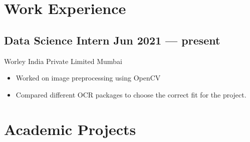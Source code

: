 \documentclass[10pt]{article}
\newcommand{\subtext}[1]{
#1\par\vspace{-0.2cm}}
\newenvironment{zitemize}{
\begin{itemize}\itemsep2pt \parskip0pt \parsep1pt}
{\end{itemize}\vspace{-0.5cm}}
\begin{document}
\section{Work Experience}

\subsection*{Data Science Intern \hfill Jun 2021 --- present} 
\subtext{Worley India Private Limited \hfill Mumbai} 
    \begin{zitemize}
        \item Worked on image preprocessing using OpenCV
        \item Compared different OCR packages to choose the correct fit for the project.
    \end{zitemize}




\section{Academic Projects} %
\end{document}
